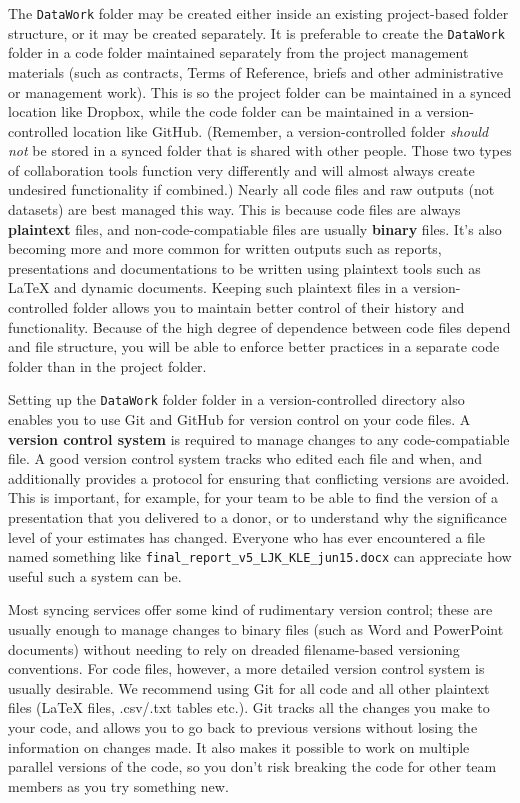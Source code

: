 The \texttt{DataWork} folder may be created either inside
an existing project-based folder structure, or it may be created separately.
It is preferable to create the \texttt{DataWork} folder
in a code folder maintained separately from the project management materials 
(such as contracts, Terms of Reference, briefs and other administrative or management work).
This is so the project folder can be maintained in a synced location like Dropbox,
while the code folder can be maintained in a version-controlled location like GitHub.
(Remember, a version-controlled folder \textit{should not}
be stored in a synced folder that is shared with other people.
Those two types of collaboration tools function very differently
and will almost always create undesired functionality if combined.)
Nearly all code files and raw outputs (not datasets) are best managed this way.
This is because code files are always \textbf{plaintext} files,
and non-code-compatiable files are usually \textbf{binary} files.
It's also becoming more and more common for written outputs such as reports,
presentations and documentations to be written using plaintext
tools such as {\LaTeX} and dynamic documents.\index{{\LaTeX}}
Keeping such plaintext files in a version-controlled folder allows you
to maintain better control of their history and functionality.
Because of the high degree of dependence between code files depend and file structure,
you will be able to enforce better practices in a separate code folder than in the project folder.

Setting up the \texttt{DataWork} folder folder in a version-controlled directory
also enables you to use Git and GitHub for version control on your code files.
A \textbf{version control system} is required to manage changes to any code-compatiable file.
A good version control system tracks who edited each file and when,
and additionally provides a protocol for ensuring that conflicting versions are avoided.
This is important, for example, for your team
to be able to find the version of a presentation that you delivered to a donor,
or to understand why the significance level of your estimates has changed.
Everyone who has ever encountered a file named something like \texttt{final\_report\_v5\_LJK\_KLE\_jun15.docx}
can appreciate how useful such a system can be.


Most syncing services offer some kind of rudimentary version control;
these are usually enough to manage changes to binary files (such as Word and PowerPoint documents)
without needing to rely on dreaded filename-based versioning conventions.
For code files, however, a more detailed version control system is usually desirable.
We recommend using Git for all code and all other plaintext files ({\LaTeX} files, .csv/.txt tables etc.).
Git tracks all the changes you make to your code,
and allows you to go back to previous versions without losing the information on changes made.
It also makes it possible to work on multiple parallel versions of the code,
so you don't risk breaking the code for other team members as you try something new.

